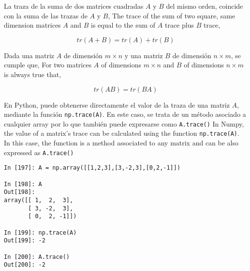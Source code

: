 \begin{paracol}{2}
La traza de la suma de dos matrices cuadradas $A$ y $B$ del mismo orden, coincide con la suma de las trazas de $A$ y $B$,
\switchcolumn
The trace of the sum of two square, same dimension matrices $A$ and $B$ is equal to the sum of $A$ trace plus $B$ trace, 
\end{paracol}

\begin{equation*}
tr(A+B)=tr(A)+tr(B)
\end{equation*}

\begin{paracol}{2}
Dada una  matriz $A$ de dimensión $m\times n$  y una matriz $B$ de dimensión $n \times m$, se  cumple que,
\switchcolumn
For two matrices $A$ of dimensions $m\times n$ and $B$ of dimensions $n\times m$ is  always true that,
\end{paracol}

\begin{equation*}
tr(AB)=tr(BA)
\end{equation*}
\begin{paracol}{2}
En Python, puede obtenerse directamente el valor de la traza de una matriz $A$, mediante la función \texttt{np.trace(A)}. En este caso, se trata de un método asociado a cualquier array por lo que también puede expresarse como \texttt{A.trace()}  
\switchcolumn
In Numpy, the value of a matrix's trace can be calculated using the function \texttt{np.trace(A)}. In this case, the function is a method associated to any matrix and can be also expressed as \texttt{A.trace()}  
\end{paracol}

\begin{center}
\begin{minipage}{0.5\textwidth}
\begin{verbatim}
In [197]: A = np.array([[1,2,3],[3,-2,3],[0,2,-1]])

In [198]: A
Out[198]: 
array([[ 1,  2,  3],
       [ 3, -2,  3],
       [ 0,  2, -1]])

In [199]: np.trace(A)
Out[199]: -2

In [200]: A.trace()
Out[200]: -2
\end{verbatim}
\end{minipage}
\end{center}


